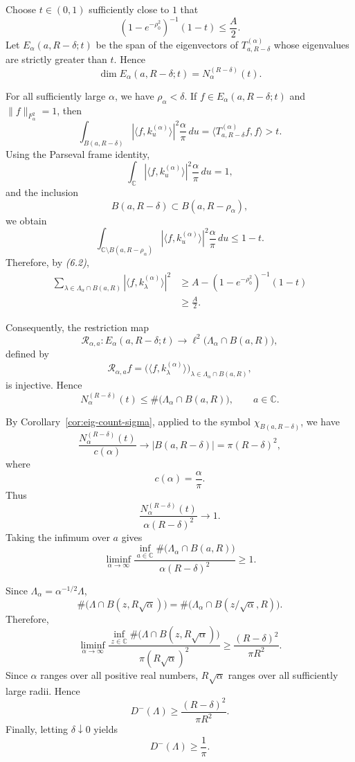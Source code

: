 \documentclass{amsart}
\theoremstyle{definition}
\theoremstyle{remark}
\numberwithin{equation}{section}
\begin{document}
Choose $t\in(0,1)$ sufficiently close to $1$ that
\[
\left(1-e^{-\rho_0^2}\right)^{-1}(1-t)
\leq \frac{A}{2}.
\]
Let $E_\alpha(a,R-\delta;t)$ be the span of the eigenvectors of
$T_{a,R-\delta}^{(\alpha)}$ whose eigenvalues are strictly greater
than $t$. Hence
\[
\dim E_\alpha(a,R-\delta;t)
=
N_\alpha^{(R-\delta)}(t).
\]

For all sufficiently large $\alpha$, we have $\rho_\alpha<\delta$.
If $f\in E_\alpha(a,R-\delta;t)$ and
$\|f\|_{F_\alpha^2}=1$, then
\[
\int_{B(a,R-\delta)}
|\langle f,k_u^{(\alpha)}\rangle|^2
\frac{\alpha}{\pi}\,du
=
\langle T_{a,R-\delta}^{(\alpha)}f,f\rangle
>t.
\]
Using the Parseval frame identity,
\[
\int_{\mathbb C}
|\langle f,k_u^{(\alpha)}\rangle|^2
\frac{\alpha}{\pi}\,du
=
1,
\]
and the inclusion
\[
B(a,R-\delta)\subset B(a,R-\rho_\alpha),
\]
we obtain
\[
\int_{\mathbb C\setminus B(a,R-\rho_\alpha)}
|\langle f,k_u^{(\alpha)}\rangle|^2
\frac{\alpha}{\pi}\,du
\leq 1-t.
\]
Therefore, by \emph{(6.2)},
\[
\begin{aligned}
\sum_{\lambda\in\Lambda_\alpha\cap B(a,R)}
|\langle f,k_\lambda^{(\alpha)}\rangle|^2
&\geq
A-
\left(1-e^{-\rho_0^2}\right)^{-1}(1-t) \\
&\geq \frac{A}{2}.
\end{aligned}
\]

Consequently, the restriction map
\[
\mathcal R_{\alpha,a}:
E_\alpha(a,R-\delta;t)
\longrightarrow
\ell^2\bigl(\Lambda_\alpha\cap B(a,R)\bigr),
\]
defined by
\[
\mathcal R_{\alpha,a}f
=
\bigl(
\langle f,k_\lambda^{(\alpha)}\rangle
\bigr)_{\lambda\in\Lambda_\alpha\cap B(a,R)},
\]
is injective. Hence
\[
N_\alpha^{(R-\delta)}(t)
\leq
\#\bigl(\Lambda_\alpha\cap B(a,R)\bigr),
\qquad
a\in\mathbb C.
\]

By Corollary~\ref{cor:eig-count-sigma}, applied to the symbol
$\chi_{B(a,R-\delta)}$, we have
\[
\frac{N_\alpha^{(R-\delta)}(t)}{c(\alpha)}
\longrightarrow
|B(a,R-\delta)|
=
\pi(R-\delta)^2,
\]
where
\[
c(\alpha)=\frac{\alpha}{\pi}.
\]
Thus
\[
\frac{N_\alpha^{(R-\delta)}(t)}
{\alpha(R-\delta)^2}
\longrightarrow 1.
\]
Taking the infimum over $a$ gives
\[
\liminf_{\alpha\to\infty}
\frac{
\inf_{a\in\mathbb C}
\#\bigl(\Lambda_\alpha\cap B(a,R)\bigr)
}{
\alpha(R-\delta)^2
}
\geq 1.
\]

Since $\Lambda_\alpha=\alpha^{-1/2}\Lambda$,
\[
\#\bigl(\Lambda\cap B(z,R\sqrt{\alpha})\bigr)
=
\#\bigl(\Lambda_\alpha\cap B(z/\sqrt{\alpha},R)\bigr).
\]
Therefore,
\[
\liminf_{\alpha\to\infty}
\frac{
\inf_{z\in\mathbb C}
\#\bigl(\Lambda\cap B(z,R\sqrt{\alpha})\bigr)
}{
\pi(R\sqrt{\alpha})^2
}
\geq
\frac{(R-\delta)^2}{\pi R^2}.
\]
Since $\alpha$ ranges over all positive real numbers, $R\sqrt{\alpha}$
ranges over all sufficiently large radii. Hence
\[
D^-(\Lambda)
\geq
\frac{(R-\delta)^2}{\pi R^2}.
\]
Finally, letting $\delta\downarrow0$ yields
\[
D^-(\Lambda)\geq\frac1\pi.
\]
\end{document}
